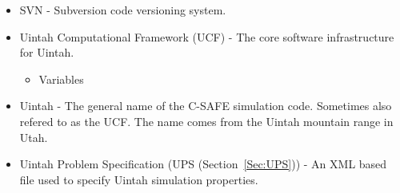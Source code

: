 \begin{itemize}
\item SVN - Subversion code versioning system.

\item Uintah Computational Framework (UCF) - The core software
  infrastructure for Uintah.
  \begin{itemize}
    \item Variables
  \end{itemize}

\item Uintah - The general name of the C-SAFE simulation code.
  Sometimes also refered to as the UCF.  The name comes from the
  Uintah mountain range in Utah.

\item Uintah Problem Specification (UPS (Section~\ref{Sec:UPS})) - An XML based file used to
  specify Uintah simulation properties.


\end{itemize}
